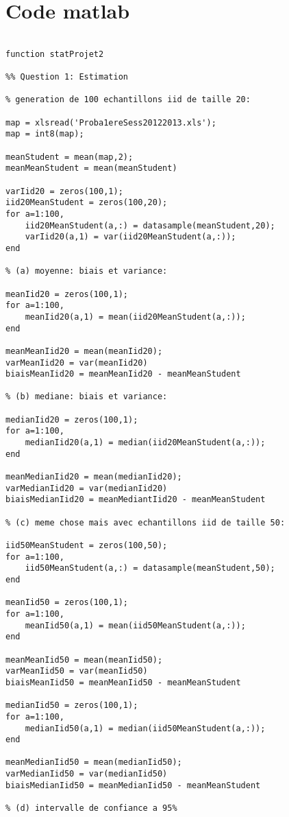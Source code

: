 \documentclass[11pt]{report}
\begin{document}
\chapter*{Code matlab}

\begin{lstlisting}

function statProjet2

%% Question 1: Estimation

% generation de 100 echantillons iid de taille 20:

map = xlsread('Proba1ereSess20122013.xls'); 
map = int8(map);

meanStudent = mean(map,2);
meanMeanStudent = mean(meanStudent)

varIid20 = zeros(100,1);
iid20MeanStudent = zeros(100,20);
for a=1:100,
    iid20MeanStudent(a,:) = datasample(meanStudent,20);
    varIid20(a,1) = var(iid20MeanStudent(a,:));
end

% (a) moyenne: biais et variance:

meanIid20 = zeros(100,1);
for a=1:100,
    meanIid20(a,1) = mean(iid20MeanStudent(a,:));
end

meanMeanIid20 = mean(meanIid20);
varMeanIid20 = var(meanIid20)
biaisMeanIid20 = meanMeanIid20 - meanMeanStudent

% (b) mediane: biais et variance:

medianIid20 = zeros(100,1);
for a=1:100,
    medianIid20(a,1) = median(iid20MeanStudent(a,:));
end

meanMedianIid20 = mean(medianIid20);
varMedianIid20 = var(medianIid20)
biaisMedianIid20 = meanMediantIid20 - meanMeanStudent

% (c) meme chose mais avec echantillons iid de taille 50:

iid50MeanStudent = zeros(100,50);
for a=1:100,
    iid50MeanStudent(a,:) = datasample(meanStudent,50);
end

meanIid50 = zeros(100,1);
for a=1:100,
    meanIid50(a,1) = mean(iid50MeanStudent(a,:));
end

meanMeanIid50 = mean(meanIid50);
varMeanIid50 = var(meanIid50)
biaisMeanIid50 = meanMeanIid50 - meanMeanStudent

medianIid50 = zeros(100,1);
for a=1:100,
    medianIid50(a,1) = median(iid50MeanStudent(a,:));
end

meanMedianIid50 = mean(medianIid50);
varMedianIid50 = var(medianIid50)
biaisMedianIid50 = meanMedianIid50 - meanMeanStudent

% (d) intervalle de confiance a 95%


\end{lstlisting}
\end{document}
